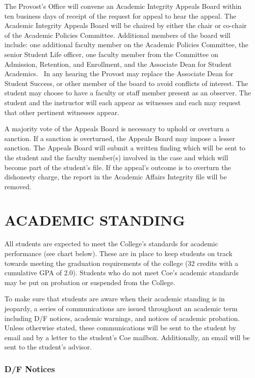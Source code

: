 \documentclass[
  letterpaper,
]{scrbook}
\begin{document}
The Provost's Office will convene an Academic Integrity Appeals Board
within ten business days of receipt of the request for appeal to hear
the appeal. The Academic Integrity Appeals Board will be chaired by
either the chair or co-chair of the Academic Policies Committee.
Additional members of the board will include: one additional faculty
member on the Academic Policies Committee, the senior Student Life
officer, one faculty member from the Committee on Admission, Retention,
and Enrollment, and the Associate Dean for Student Academics. ~In any
hearing the Provost may replace the Associate Dean for Student Success,
or other member of the board to avoid conflicts of interest. The student
may choose to have a faculty or staff member present as an observer. The
student and the instructor will each appear as witnesses and each may
request that other pertinent witnesses appear.

A majority vote of the Appeals Board is necessary to uphold or overturn
a sanction. If a sanction is overturned, the Appeals Board may impose a
lesser sanction. The Appeals Board will submit a written finding which
will be sent to the student and the faculty member(s) involved in the
case and which will become part of the student's file. If the appeal's
outcome is to overturn the dishonesty charge, the report in the Academic
Affairs Integrity file will be removed.

\chapter{ACADEMIC STANDING}\label{sec-academic-standing}

All students are expected to meet the College's standards for academic
performance (see chart below). These are in place to keep students on
track towards meeting the graduation requirements of the college (32
credits with a cumulative GPA of 2.0). Students who do not meet Coe's
academic standards may be put on probation or suspended from the
College.

To make sure that students are aware when their academic standing is in
jeopardy, a series of communications are issued throughout an academic
term including D/F notices, academic warnings, and notices of academic
probation. Unless otherwise stated, these communications will be sent to
the student by email and by a letter to the student's Coe mailbox.
Additionally, an email will be sent to the student's advisor.

\subsection{D/F Notices}\label{df-notices}
\end{document}
